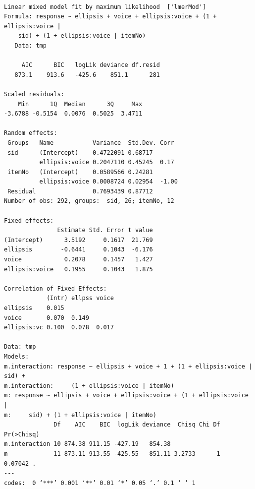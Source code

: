 \documentclass[11pt]{article}
\begin{document}
\begin{verbatim}

Linear mixed model fit by maximum likelihood  ['lmerMod']
Formula: response ~ ellipsis + voice + ellipsis:voice + (1 + ellipsis:voice |  
    sid) + (1 + ellipsis:voice | itemNo)
   Data: tmp

     AIC      BIC   logLik deviance df.resid 
   873.1    913.6   -425.6    851.1      281 

Scaled residuals: 
    Min      1Q  Median      3Q     Max 
-3.6788 -0.5154  0.0076  0.5025  3.4711 

Random effects:
 Groups   Name           Variance  Std.Dev. Corr 
 sid      (Intercept)    0.4722091 0.68717       
          ellipsis:voice 0.2047110 0.45245  0.17 
 itemNo   (Intercept)    0.0589566 0.24281       
          ellipsis:voice 0.0008724 0.02954  -1.00
 Residual                0.7693439 0.87712       
Number of obs: 292, groups:  sid, 26; itemNo, 12

Fixed effects:
               Estimate Std. Error t value
(Intercept)      3.5192     0.1617  21.769
ellipsis        -0.6441     0.1043  -6.176
voice            0.2078     0.1457   1.427
ellipsis:voice   0.1955     0.1043   1.875

Correlation of Fixed Effects:
            (Intr) ellpss voice
ellipsis    0.015              
voice       0.070  0.149       
ellipsis:vc 0.100  0.078  0.017

Data: tmp
Models:
m.interaction: response ~ ellipsis + voice + 1 + (1 + ellipsis:voice | sid) + 
m.interaction:     (1 + ellipsis:voice | itemNo)
m: response ~ ellipsis + voice + ellipsis:voice + (1 + ellipsis:voice | 
m:     sid) + (1 + ellipsis:voice | itemNo)
              Df    AIC    BIC  logLik deviance  Chisq Chi Df Pr(>Chisq)  
m.interaction 10 874.38 911.15 -427.19   854.38                           
m             11 873.11 913.55 -425.55   851.11 3.2733      1    0.07042 .
---
codes:  0 ‘***’ 0.001 ‘**’ 0.01 ‘*’ 0.05 ‘.’ 0.1 ‘ ’ 1
\end{verbatim}
\end{document}
